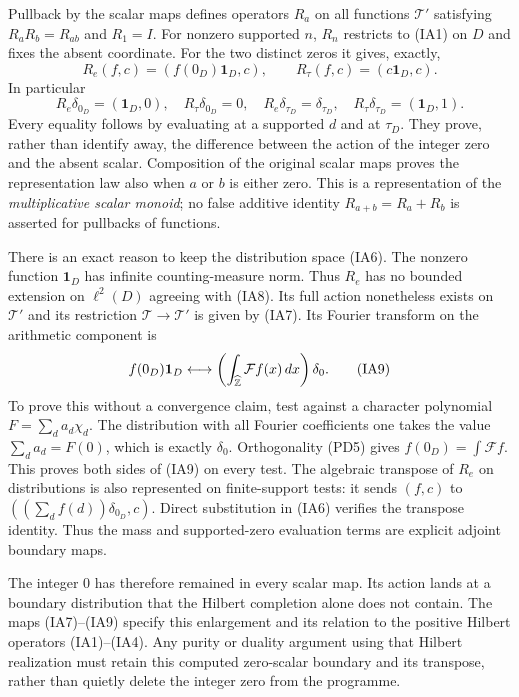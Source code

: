 Pullback by the scalar maps defines operators $R_a$ on all functions
$\mathcal T'$ satisfying $R_aR_b=R_{ab}$ and $R_1=I$. For nonzero
supported $n$, $R_n$ restricts to (IA1) on $D$ and fixes the absent
coordinate. For the two distinct zeros it gives, exactly,
\[
 R_e(f,c)=(f(0_D)\mathbf1_D,c),\qquad
 R_\tau(f,c)=(c\mathbf1_D,c).
 \tag{IA7}\label{eq:IA-two-zero-operators}
\]
In particular
\[
 R_e\delta_{0_D}=(\mathbf1_D,0),\quad
 R_\tau\delta_{0_D}=0,\quad
 R_e\delta_{\tau_D}=\delta_{\tau_D},\quad
 R_\tau\delta_{\tau_D}=(\mathbf1_D,1).
 \tag{IA8}
\]
Every equality follows by evaluating at a supported $d$ and at
$\tau_D$. They prove, rather than identify away, the difference
between the action of the integer zero and the absent scalar.
Composition of the original scalar maps proves the representation law
also when $a$ or $b$ is either zero. This is a representation of the
\emph{multiplicative scalar monoid}; no false additive identity
$R_{a+b}=R_a+R_b$ is asserted for pullbacks of functions.

There is an exact reason to keep the distribution space (IA6).
The nonzero function $\mathbf1_D$ has infinite counting-measure norm.
Thus $R_e$ has no bounded extension on $\ell^2(D)$ agreeing with
(IA8). Its full action nonetheless exists on $\mathcal T'$ and its
restriction $\mathcal T\to\mathcal T'$ is given by (IA7).
Its Fourier transform on the arithmetic component is
\[
 f(0_D)\mathbf1_D
 \longleftrightarrow
 \left(\int_{\widehat{\mathbb Z}}\mathcal F f(x)\,dx\right)\delta_0.
 \tag{IA9}\label{eq:IA-zero-Fourier}
\]
To prove this without a convergence claim, test against a character
polynomial $F=\sum_da_d\chi_d$. The distribution with all Fourier
coefficients one takes the value $\sum_da_d=F(0)$, which is exactly
$\delta_0$. Orthogonality (PD5) gives
$f(0_D)=\int\mathcal F f$. This proves both sides of (IA9) on every
test. The algebraic transpose of $R_e$ on distributions is also
represented on finite-support tests: it sends
$(f,c)$ to $((\sum_df(d))\delta_{0_D},c)$. Direct substitution in
(IA6) verifies the transpose identity. Thus the mass and supported-zero
evaluation terms are explicit adjoint boundary maps.

The integer $0$ has therefore remained in every scalar map. Its action
lands at a boundary distribution that the Hilbert completion alone
does not contain. The maps (IA7)--(IA9) specify this enlargement and
its relation to the positive Hilbert operators (IA1)--(IA4). Any
purity or duality argument using that Hilbert realization must retain
this computed zero-scalar boundary and its transpose, rather than
quietly delete the integer zero from the programme.
